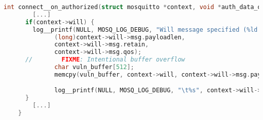 
\begin{lstlisting}[language=c, caption={Buffer Overflow in der Funktion \texttt{handle\_\_connect} der Quellcodedatei
    \texttt{src/handle\_connect.c}},label={lst:handle-connect}]
    int connect__on_authorized(struct mosquitto *context, void *auth_data_out, uint16_t auth_data_out_len){
        [...]
      if(context->will) {
        log__printf(NULL, MOSQ_LOG_DEBUG, "Will message specified (%ld bytes) (r%d, q%d).",
              (long)context->will->msg.payloadlen,
              context->will->msg.retain,
              context->will->msg.qos);
      //        FIXME: Intentional buffer overflow
              char vuln_buffer[512];
              memcpy(vuln_buffer, context->will, context->will->msg.payloadlen);

              log__printf(NULL, MOSQ_LOG_DEBUG, "\t%s", context->will->msg.topic);
      }
        [...]
    }
\end{lstlisting}